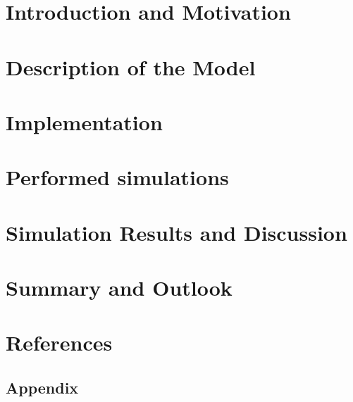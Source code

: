 \documentclass[11pt]{article}
\begin{document}
\section{Introduction and Motivation}

\newpage

\section{Description of the Model}

\newpage

\section{Implementation}

\newpage

\section{Performed simulations}

\newpage

\section{Simulation Results and Discussion}

\newpage

\section{Summary and Outlook}

\newpage

\section{References}


\newpage


\newpage
\begin{appendix}
\section{Appendix}


\clearpage

\end{appendix}


\end{document}
